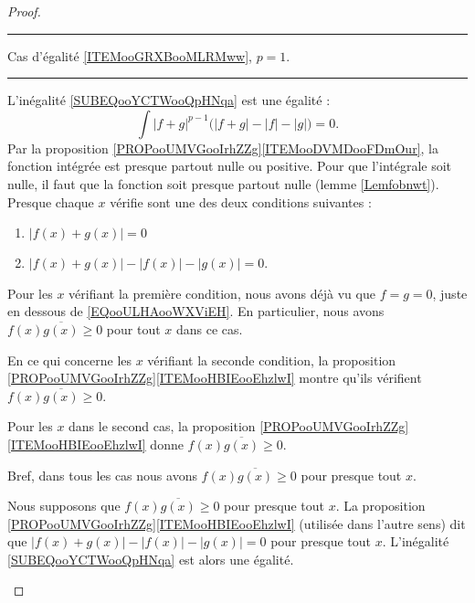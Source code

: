 \begin{proof}
	\begin{center}
		\noindent\rule{2cm}{0.4pt}
		Cas d'égalité \ref{ITEMooGRXBooMLRMww}, $p=1$.
		\noindent\rule{2cm}{0.4pt}
	\end{center}

	\begin{subproof}
		\spitem[\( \Rightarrow\)]

		L'inégalité \eqref{SUBEQooYCTWooQpHNqa} est une égalité :
		\begin{equation}
			\int | f+g |^{p-1}\big( | f+g |-| f |-| g | \big)=0.
		\end{equation}
		Par la proposition \ref{PROPooUMVGooIrhZZg}\ref{ITEMooDVMDooFDmOur}, la fonction intégrée est presque partout nulle ou positive. Pour que l'intégrale soit nulle, il faut que la fonction soit presque partout nulle (lemme \ref{Lemfobnwt}). Presque chaque \( x\) vérifie sont une des deux conditions suivantes :
		\begin{enumerate}
			\item
			      \( | f(x)+g(x) |=0\)
			\item
			      \( | f(x)+g(x) |-| f(x) |-| g(x) |=0\).
		\end{enumerate}
		Pour les \( x\) vérifiant la première condition, nous avons déjà vu que \( f=g=0\), juste en dessous de \eqref{EQooULHAooWXViEH}. En particulier, nous avons \( f(x)\overline{g(x)}\geq 0\) pour tout \( x\) dans ce cas.

		En ce qui concerne les \( x\) vérifiant la seconde condition, la proposition \ref{PROPooUMVGooIrhZZg}\ref{ITEMooHBIEooEhzlwI} montre qu'ils vérifient \( f(x)\overline{g(x)}\geq 0\).

		Pour les \( x\) dans le second cas, la proposition \ref{PROPooUMVGooIrhZZg}\ref{ITEMooHBIEooEhzlwI} donne $f(x)\overline{g(x)}\geq 0$.

		Bref, dans tous les cas nous avons \( f(x)\overline{g(x)}\geq 0\) pour presque tout \( x\).
		\spitem[\( \Leftarrow\)]

		Nous supposons que \( f(x)\overline{g(x)}\geq 0\) pour presque tout \( x\). La proposition \ref{PROPooUMVGooIrhZZg}\ref{ITEMooHBIEooEhzlwI} (utilisée dans l'autre sens) dit que \( | f(x)+g(x) |-| f(x) |-| g(x) |=0\) pour presque tout \( x\). L'inégalité \eqref{SUBEQooYCTWooQpHNqa} est alors une égalité.

	\end{subproof}



\end{proof}
